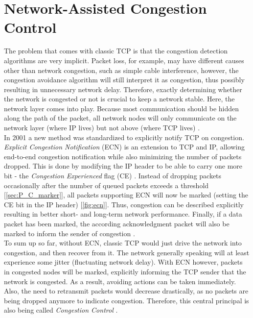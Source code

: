 \documentclass[a4paper,conference]{IEEEtran}
\begin{document}
\section{Network-Assisted Congestion Control}
\label{sec:cc}
The problem that comes with classic TCP is that the congestion detection algorithms are very implicit. Packet loss, for example, may have different causes other than network congestion, such as simple cable interference, however, the congestion avoidance algorithm will still interpret it as congestion, thus possibly resulting in unnecessary network delay. Therefore, exactly determining whether the network is congested or not is crucial to keep a network stable. Here, the network layer comes into play. Because most communication should be hidden along the path of the packet, all network nodes will only communicate on the network layer (where IP lives) but not above (where TCP lives) \cite{ramakrishnan1999proposal}.\\
In 2001 a new method was standardized to explicitly notify TCP on congestion. \textit{Explicit Congestion Notification} (ECN) is an extension to TCP and IP, allowing end-to-end congestion notification while also minimizing the number of packets dropped. This is done by modifying the IP header to be able to carry one more bit - the \textit{Congestion Experienced} flag (CE) \cite{ramakrishnan1999proposal}. Instead of dropping packets occasionally after the number of queued packets exceeds a threshold [\autoref{sec:P_C_marker}], all packets supporting ECN will now be marked (setting the CE bit in the IP header) [\autoref{fig:ecn}]. Thus, congestion can be described explicitly resulting in better short- and long-term network performance. Finally, if a data packet has been marked, the according acknowledgment packet will also be marked to inform the sender of congestion \cite{ramakrishnan1999proposal,ramakrishnan2001addition,10.1145/205511.205512}.\\
To sum up so far, without ECN, classic TCP would just drive the network into congestion, and then recover from it. The network generally speaking will at least experience some jitter (fluctuating network delay). With ECN however, packets in congested nodes will be marked, explicitly informing the TCP sender that the network is congested. As a result, avoiding actions can be taken immediately. Also, the need to retransmit packets would decrease drastically, as no packets are being dropped anymore to indicate congestion. Therefore, this central principal is also being called \textit{Congestion Control} \cite{ramakrishnan1999proposal,ramakrishnan2001addition}.
\end{document}
